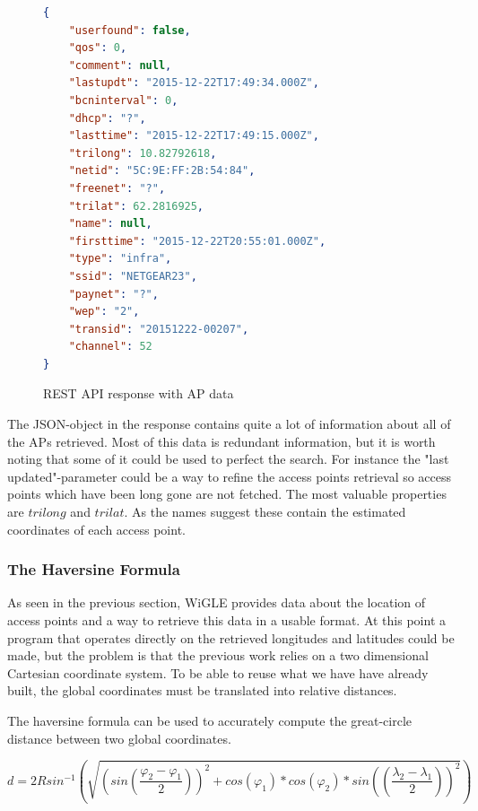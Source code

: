 	\begin{figure}

	\begin{lstlisting}[language=json]
{
	"userfound": false,
	"qos": 0,
	"comment": null,
	"lastupdt": "2015-12-22T17:49:34.000Z",
	"bcninterval": 0,
	"dhcp": "?",
	"lasttime": "2015-12-22T17:49:15.000Z",
	"trilong": 10.82792618,
	"netid": "5C:9E:FF:2B:54:84",
	"freenet": "?",
	"trilat": 62.2816925,
	"name": null,
	"firsttime": "2015-12-22T20:55:01.000Z",
	"type": "infra",
	"ssid": "NETGEAR23",
	"paynet": "?",
	"wep": "2",
	"transid": "20151222-00207",
	"channel": 52
}

\end{lstlisting}
\caption{REST API response with AP data}
\label{fig:wigle}
\end{figure}

The JSON-object in the response contains quite a lot of information about all of the APs retrieved. Most of this data is redundant information, but it is worth noting that some of it could be used to perfect the search. For instance the "last updated"-parameter could be a way to refine the access points retrieval so access points which have been long gone are not fetched. The most valuable properties are $trilong$ and $trilat$. As the names suggest these contain the estimated coordinates of each access point.

\subsubsection{The Haversine Formula}
As seen in the previous section, WiGLE provides data about the location of access points and a way to retrieve this data in a usable format. 
At this point a program that operates directly on the retrieved longitudes and latitudes could be made, but the problem is that the previous work relies on a two
dimensional Cartesian coordinate system. To be able to reuse what we have have already built, the global coordinates must be translated into relative distances.

The haversine formula \cite{virtues} can be used to accurately compute the great-circle distance between two global coordinates.

\[
	d =2R sin^{-1} \left(\sqrt{ \left(sin\left(\frac{\varphi_2-\varphi_1}{2} \right)\right)^2 + cos(\varphi_1) * cos(\varphi_2) * sin\left(\left( \frac{\lambda_2 - \lambda_1}{2} \right)\right)^2} \right)
\]	


